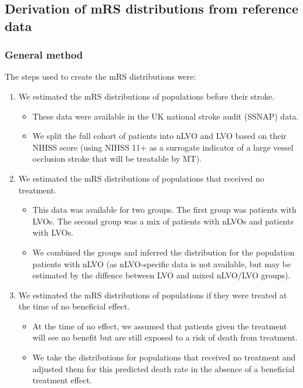\subsection{Derivation of mRS distributions from reference data}

\subsubsection{General method}

The steps used to create the mRS distributions were:

\begin{enumerate}
    \item We estimated the mRS distributions of populations before their stroke.
    \begin{itemize}
        \item These data were available in the UK national stroke audit (SSNAP) data.
        \item We split the full cohort of patients into nLVO and LVO based on their NIHSS score (using NIHSS 11+ as a surrogate indicator of a large vessel occlusion stroke that will be treatable by MT).
    \end{itemize}
     \item We estimated the mRS distributions of populations that received no treatment.
    \begin{itemize}
        \item This data was available for two groups. The first group was patients with LVOs. The second group was a mix of patients with nLVOs and patients with LVOs.
        \item We combined the groups and inferred the distribution for the population patients with nLVO (as nLVO-specific data is not available, but may be estimated by the diffence between LVO and mixed nLVO/LVO groups).
    \end{itemize}
        \item We estimated the mRS distributions of populations if they were treated at the time of no beneficial effect.
    \begin{itemize}
        \item At the time of no effect, we assumed that patients given the treatment will see no benefit but are still exposed to a risk of death from treatment.
    \item We take the distributions for populations that received no treatment and adjusted them for this predicted death rate in the absence of a beneficial treatment effect.

\end{itemize}
\end{enumerate}

